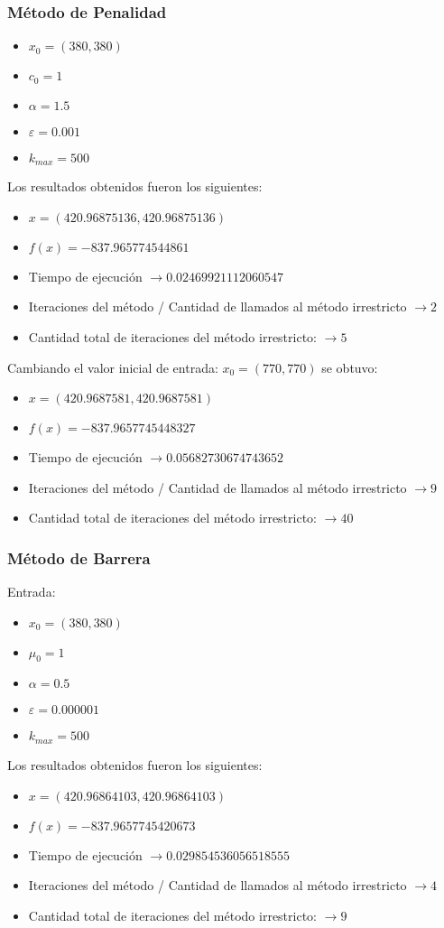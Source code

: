 \documentclass[titlepage, 11pt]{scrartcl}
\begin{document}
	\subsubsection{Método de Penalidad}
	\begin{itemize}
		\item $x_0 = (380, 380)$
		\item $c_0 = 1$
		\item $\alpha = 1.5$
		\item $\varepsilon = 0.001$
		\item $k_{max} = 500$
	\end{itemize}
	Los resultados obtenidos fueron los siguientes:
	\begin{itemize}
		\item $x = (420.96875136, 420.96875136)$
		\item $f(x) = -837.965774544861$
		\item Tiempo de ejecución $\rightarrow 0.02469921112060547$
		\item Iteraciones del método / Cantidad de llamados al método irrestricto $\rightarrow 2$
		\item Cantidad total de iteraciones del método irrestricto: $\rightarrow 5$
	\end{itemize}
	Cambiando el valor inicial de entrada: $x_0 = (770, 770)$ se obtuvo:
	\begin{itemize}
		\item $x = (420.9687581, 420.9687581)$
		\item $f(x) = -837.9657745448327$
		\item Tiempo de ejecución $\rightarrow  0.05682730674743652$
		\item Iteraciones del método / Cantidad de llamados al método irrestricto $\rightarrow 9$
		\item Cantidad total de iteraciones del método irrestricto: $\rightarrow 40$
	\end{itemize}

	\subsubsection{Método de Barrera}
		Entrada:
	\begin{itemize}
		\item $x_0 = (380, 380)$
		\item $\mu_0 = 1$
		\item $\alpha = 0.5$
		\item $\varepsilon = 0.000001$
		\item $k_{max} = 500$
	\end{itemize}
	Los resultados obtenidos fueron los siguientes:
	\begin{itemize}
		\item $x = (420.96864103, 420.96864103)$
		\item $f(x) = -837.9657745420673$
		\item Tiempo de ejecución $\rightarrow 0.029854536056518555$
		\item Iteraciones del método / Cantidad de llamados al método irrestricto $\rightarrow 4$
		\item Cantidad total de iteraciones del método irrestricto: $\rightarrow 9$
	\end{itemize}
	
\end{document}

